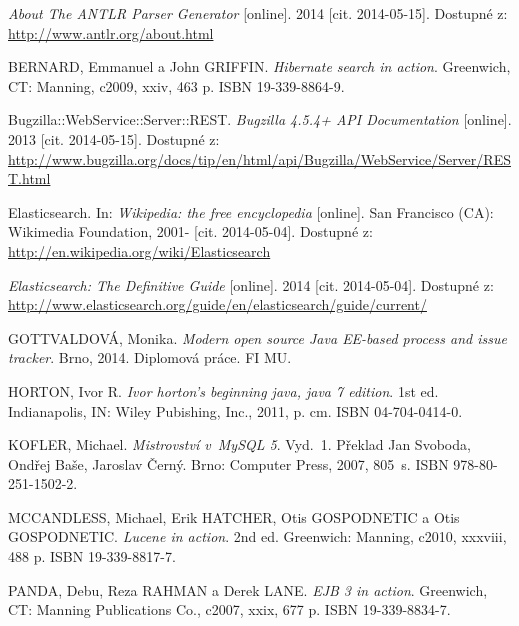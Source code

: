 \documentclass[11pt,oneside]{fithesis2}
\begin{document}
\begin{thebibliography}{1}

\textit{About The ANTLR Parser Generator} [online]. 2014 [cit. 2014-05-15]. Dostupné z: \url{http://www.antlr.org/about.html}

BERNARD, Emmanuel a John GRIFFIN. \textit{Hibernate search in action}. Greenwich, CT: Manning, c2009, xxiv, 463 p. ISBN 19-339-8864-9. 

Bugzilla::WebService::Server::REST. \textit{Bugzilla 4.5.4+ API Documentation} [online]. 2013 [cit. 2014-05-15]. Dostupné z: \url{http://www.bugzilla.org/docs/tip/en/html/api/Bugzilla/WebService/Server/REST.html}

Elasticsearch. In: \textit{Wikipedia: the free encyclopedia} [online]. San Francisco (CA): Wikimedia Foundation, 2001- [cit. 2014-05-04]. Dostupné z: \url{http://en.wikipedia.org/wiki/Elasticsearch}

\textit{Elasticsearch: The Definitive Guide} [online]. 2014 [cit. 2014-05-04]. Dostupné z: \url{http://www.elasticsearch.org/guide/en/elasticsearch/guide/current/}

GOTTVALDOVÁ, Monika. \textit{Modern open source Java EE-based process and issue tracker}. Brno, 2014. Diplomová práce. FI MU.

HORTON, Ivor R. \textit{Ivor horton's beginning java, java 7 edition}. 1st ed. Indianapolis, IN: Wiley Pubishing, Inc., 2011, p. cm. ISBN 04-704-0414-0. 

KOFLER, Michael. \textit{Mistrovství v~MySQL 5}. Vyd.~1. Překlad Jan Svoboda, Ondřej Baše, Jaroslav Černý. Brno: Computer Press, 2007, 805~s. ISBN 978-80-251-1502-2. 

MCCANDLESS, Michael, Erik HATCHER, Otis GOSPODNETIC a Otis GOSPODNETIC. \textit{Lucene in action}. 2nd ed. Greenwich: Manning, c2010, xxxviii, 488 p. ISBN 19-339-8817-7. 

PANDA, Debu, Reza RAHMAN a Derek LANE. \textit{EJB 3 in action}. Greenwich, CT: Manning Publications Co., c2007, xxix, 677 p. ISBN 19-339-8834-7. 

\end{thebibliography}

\endgroup

\appendix
\end{document}
